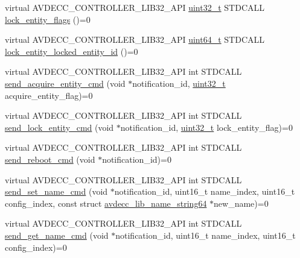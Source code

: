 \begin{DoxyCompactItemize}
\item 
virtual A\+V\+D\+E\+C\+C\+\_\+\+C\+O\+N\+T\+R\+O\+L\+L\+E\+R\+\_\+\+L\+I\+B32\+\_\+\+A\+PI \hyperlink{parse_8c_a6eb1e68cc391dd753bc8ce896dbb8315}{uint32\+\_\+t} S\+T\+D\+C\+A\+LL \hyperlink{classavdecc__lib_1_1descriptor__base_a757e66272bba4c52cefa914df8c60bb5}{lock\+\_\+entity\+\_\+flags} ()=0
\item 
virtual A\+V\+D\+E\+C\+C\+\_\+\+C\+O\+N\+T\+R\+O\+L\+L\+E\+R\+\_\+\+L\+I\+B32\+\_\+\+A\+PI \hyperlink{parse_8c_aec6fcb673ff035718c238c8c9d544c47}{uint64\+\_\+t} S\+T\+D\+C\+A\+LL \hyperlink{classavdecc__lib_1_1descriptor__base_a052b47529d0e60ca87894159fcb65e14}{lock\+\_\+entity\+\_\+locked\+\_\+entity\+\_\+id} ()=0
\item 
virtual A\+V\+D\+E\+C\+C\+\_\+\+C\+O\+N\+T\+R\+O\+L\+L\+E\+R\+\_\+\+L\+I\+B32\+\_\+\+A\+PI int S\+T\+D\+C\+A\+LL \hyperlink{classavdecc__lib_1_1descriptor__base_adfd0cf2a51bff7d762b0efc743480c48}{send\+\_\+acquire\+\_\+entity\+\_\+cmd} (void $\ast$notification\+\_\+id, \hyperlink{parse_8c_a6eb1e68cc391dd753bc8ce896dbb8315}{uint32\+\_\+t} acquire\+\_\+entity\+\_\+flag)=0
\item 
virtual A\+V\+D\+E\+C\+C\+\_\+\+C\+O\+N\+T\+R\+O\+L\+L\+E\+R\+\_\+\+L\+I\+B32\+\_\+\+A\+PI int S\+T\+D\+C\+A\+LL \hyperlink{classavdecc__lib_1_1descriptor__base_a1ac1f5c700f4eebd37b7c45498b36bbc}{send\+\_\+lock\+\_\+entity\+\_\+cmd} (void $\ast$notification\+\_\+id, \hyperlink{parse_8c_a6eb1e68cc391dd753bc8ce896dbb8315}{uint32\+\_\+t} lock\+\_\+entity\+\_\+flag)=0
\item 
virtual A\+V\+D\+E\+C\+C\+\_\+\+C\+O\+N\+T\+R\+O\+L\+L\+E\+R\+\_\+\+L\+I\+B32\+\_\+\+A\+PI int S\+T\+D\+C\+A\+LL \hyperlink{classavdecc__lib_1_1descriptor__base_a1618412a9b3d57a12044030b31cfd5a3}{send\+\_\+reboot\+\_\+cmd} (void $\ast$notification\+\_\+id)=0
\item 
virtual A\+V\+D\+E\+C\+C\+\_\+\+C\+O\+N\+T\+R\+O\+L\+L\+E\+R\+\_\+\+L\+I\+B32\+\_\+\+A\+PI int S\+T\+D\+C\+A\+LL \hyperlink{classavdecc__lib_1_1descriptor__base_a6a8c227d7a202f251c689107df7ede0b}{send\+\_\+set\+\_\+name\+\_\+cmd} (void $\ast$notification\+\_\+id, uint16\+\_\+t name\+\_\+index, uint16\+\_\+t config\+\_\+index, const struct \hyperlink{structavdecc__lib_1_1avdecc__lib__name__string64}{avdecc\+\_\+lib\+\_\+name\+\_\+string64} $\ast$new\+\_\+name)=0
\item 
virtual A\+V\+D\+E\+C\+C\+\_\+\+C\+O\+N\+T\+R\+O\+L\+L\+E\+R\+\_\+\+L\+I\+B32\+\_\+\+A\+PI int S\+T\+D\+C\+A\+LL \hyperlink{classavdecc__lib_1_1descriptor__base_a27ba9959456de53a8de18eead74806f7}{send\+\_\+get\+\_\+name\+\_\+cmd} (void $\ast$notification\+\_\+id, uint16\+\_\+t name\+\_\+index, uint16\+\_\+t config\+\_\+index)=0

\end{DoxyCompactItemize}
